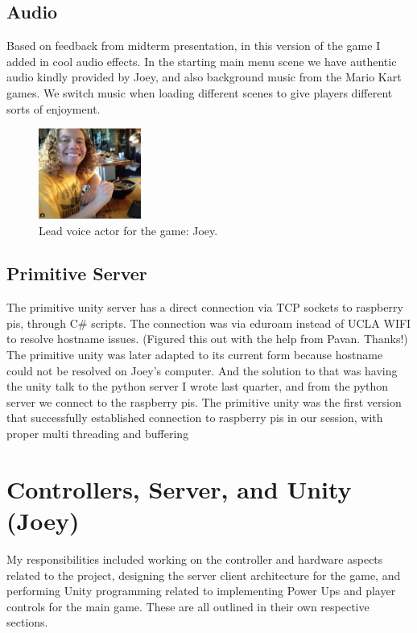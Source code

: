 \documentclass[a4paper,10pt]{article}
\begin{document}
\subsection{Audio}
Based on feedback from midterm presentation, in this version of the game I added in cool audio effects. In the starting main menu scene we have authentic audio kindly provided by Joey, and also background music from the Mario Kart games. We switch music when loading different scenes to give players different sorts of enjoyment. 
 \begin{figure}[H]
  \centering
      \includegraphics[width=0.3\textwidth]{Assets/Joey.png}
  \caption{Lead voice actor for the game: Joey.}
\end{figure}

\subsection{Primitive Server}
The primitive unity server has a direct connection via TCP sockets to raspberry pis, through C\# scripts. The connection was via eduroam instead of UCLA WIFI to resolve hostname issues. (Figured this out with the help from Pavan. Thanks!)
The primitive unity was later adapted to its current form because hostname could not be resolved on Joey's computer. And the solution to that was having the unity talk to the python server I wrote last quarter, and from the python server we connect to the raspberry pis. 
The primitive unity was the first version that successfully established connection to raspberry pis in our session, with proper multi threading and buffering


\section{Controllers, Server, and Unity (Joey)}
My responsibilities included working on the controller and hardware aspects related to the project, designing the server client architecture for the game, and performing Unity programming related to implementing Power Ups and player controls for the main game. These are all outlined in their own respective sections.
 
\end{document}
